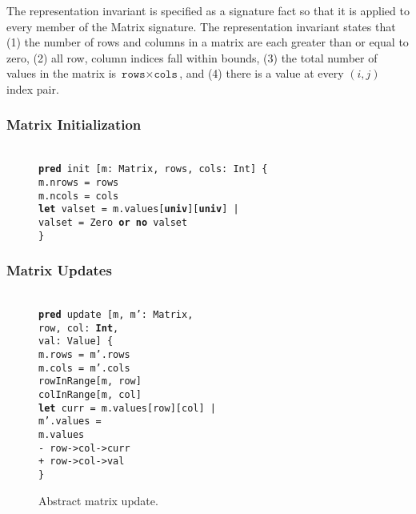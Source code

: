 \documentclass[11pt,conference]{IEEEtran}
\newenvironment{myquote}{\list{}{\leftmargin=12pt\rightmargin=0pt}\item[]}{\endlist}
\def\TA{\makebox[12pt]{}}
\def\TB{\makebox[24pt]{}}
\def\TC{\makebox[36pt]{}}
\def\TD{\makebox[48pt]{}}
\def\Bpred{\textbf{pred} }
\def\Bor{\textbf{or} }
\def\Bno{\textbf{no} }
\def\Blet{\textbf{let} }
\def\Bint{\textbf{Int}}
\def\Buniv{\textbf{univ}}
\begin{document}
The representation invariant is specified as a signature fact so that it is applied to every member of the Matrix signature.  The representation invariant states that (1) the number of rows and columns in a matrix are each greater than or equal to zero, (2) all row, column indices fall within bounds, (3) the total number of values in the matrix is $\texttt{rows}\times\texttt{cols}$, and (4) there is a value at every $\left(i, j\right)$ index pair.

\subsubsection{Matrix Initialization}

\begin{figure}
\centering
\begin{myquote}\small{\texttt{\\
\Bpred init [m: Matrix, rows, cols: Int] \{\\
\TA m.nrows = rows\\
\TA m.ncols = cols\\
\TA \Blet valset = m.values[\Buniv][\Buniv] |\\
\TB valset = Zero \Bor \Bno valset\\
\}
}}
\end{myquote}
\end{figure}

\subsubsection{Matrix Updates}

\begin{figure}
\centering
\begin{myquote}\small{\texttt{\\
\Bpred update [m, m': Matrix,\\
\TD row, col: \Bint,\\
\TD val: Value] \{\\
\TA m.rows = m'.rows\\
\TA m.cols = m'.cols\\
\TA rowInRange[m, row]\\
\TA colInRange[m, col]\\
\TA \Blet curr = m.values[row][col] |\\
\TB m'.values =\\
\TC m.values\\
\TC - row->col->curr\\
\TC + row->col->val\\
\}
}}
\end{myquote}
\caption{Abstract matrix update.}
\label{update:abstract}
\end{figure}
\end{document}
